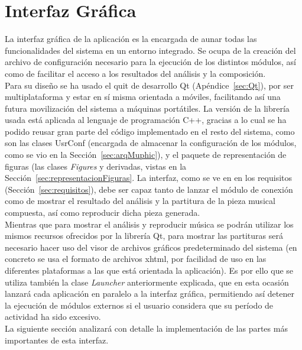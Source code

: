 \section{Interfaz Gráfica}
\label{sec:arqgui}


La interfaz gráfica de la aplicación es la encargada de aunar todas las funcionalidades del sistema en un entorno integrado. Se ocupa de la creación del archivo de configuración necesario para la ejecución de los distintos módulos, así como de facilitar el acceso a los resultados del análisis y la composición.\\

Para su diseño se ha usado el quit de desarrollo Qt (Apéndice~\ref{sec:Qt}), por ser multiplataforma y estar en sí misma orientada a móviles, facilitando así una futura movilización del sistema a máquinas portátiles. La versión de la librería usada está aplicada al lenguaje de programación C++, gracias a lo cual se ha podido reusar gran parte del código implementado en el resto del sistema, como son las clases UsrConf (encargada de almacenar la configuración de los módulos, como se vio en la Sección~\ref{sec:arqMuphic}), y el paquete de representación de figuras (las clases \emph{Figures} y derivadas, vistas en la Sección~\ref{sec:representacionFiguras}. La interfaz, como se ve en en los requisitos (Sección~\ref{sec:requisitos}), debe ser capaz tanto de lanzar el módulo de conexión como de mostrar el resultado del análisis y la partitura de la pieza musical compuesta, así como reproducir dicha pieza generada.\\

Mientras que para mostrar el análisis y reproducir música se podrán utilizar los mismos recursos ofrecidos por la librería Qt, para mostrar las partituras será necesario hacer uso del visor de archivos gráficos predeterminado del sistema (en concreto se usa el formato de archivos xhtml, por facilidad de uso en las diferentes plataformas a las que está orientada la aplicación). Es por ello que se utiliza también la clase \emph{Launcher} anteriormente explicada, que en esta ocasión lanzará cada aplicación en paralelo a la interfaz gráfica, permitiendo así detener la ejecución de módulos externos si el usuario considera que su período de actividad ha sido excesivo.\\

La siguiente sección analizará con detalle la implementación de las partes más importantes de esta interfaz.

